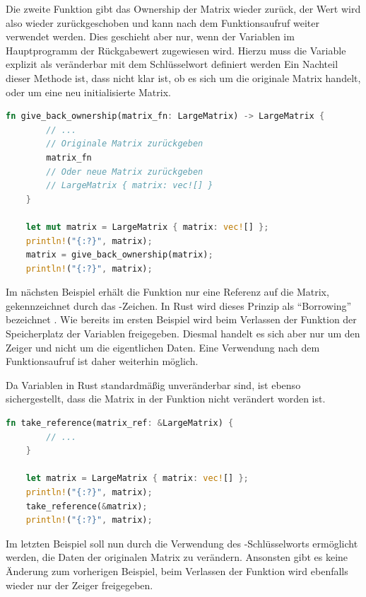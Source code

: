 \documentclass[11pt,a4paper, ngerman]{article}
\begin{document}
Die zweite Funktion gibt das Ownership der Matrix wieder zurück, der Wert wird also wieder zurückgeschoben und kann nach dem Funktionsaufruf weiter verwendet werden. Dies geschieht aber nur, wenn der Variablen im Hauptprogramm der Rückgabewert zugewiesen wird. Hierzu muss die Variable  explizit als veränderbar mit dem Schlüsselwort  definiert werden Ein Nachteil dieser Methode ist, dass nicht klar ist, ob es sich um die originale Matrix handelt, oder um eine neu initialisierte Matrix.

\newpage

\begin{lstlisting}[language=rust, caption={Einführendes Beispiel: Ownership zurückgeben}]
    fn give_back_ownership(matrix_fn: LargeMatrix) -> LargeMatrix {
        // ...
        // Originale Matrix zurückgeben
        matrix_fn
        // Oder neue Matrix zurückgeben
        // LargeMatrix { matrix: vec![] }
    }

    let mut matrix = LargeMatrix { matrix: vec![] };
    println!("{:?}", matrix);
    matrix = give_back_ownership(matrix);
    println!("{:?}", matrix);
\end{lstlisting}

Im nächsten Beispiel erhält die Funktion nur eine Referenz auf die Matrix, gekennzeichnet durch das \codeword{&}-Zeichen. In Rust wird dieses Prinzip als ``Borrowing'' bezeichnet \cite{RustBorrowing}. Wie bereits im ersten Beispiel wird beim Verlassen der Funktion der Speicherplatz der Variablen freigegeben. Diesmal handelt es sich aber nur um den Zeiger und nicht um die eigentlichen Daten. Eine Verwendung nach dem Funktionsaufruf ist daher weiterhin möglich.

Da Variablen in Rust standardmäßig unveränderbar sind, ist ebenso sichergestellt, dass die Matrix in der Funktion nicht verändert worden ist. 

\begin{lstlisting}[language=rust, caption={Einführendes Beispiel: Unveränderliche Referenz}]
    fn take_reference(matrix_ref: &LargeMatrix) {
        // ...
    }

    let matrix = LargeMatrix { matrix: vec![] };
    println!("{:?}", matrix);
    take_reference(&matrix);
    println!("{:?}", matrix);
\end{lstlisting}

Im letzten Beispiel soll nun durch die Verwendung des -Schlüsselworts ermöglicht werden, die Daten der originalen Matrix zu verändern. Ansonsten gibt es keine Änderung zum vorherigen Beispiel, beim Verlassen der Funktion wird ebenfalls wieder nur der Zeiger freigegeben.
\end{document}
